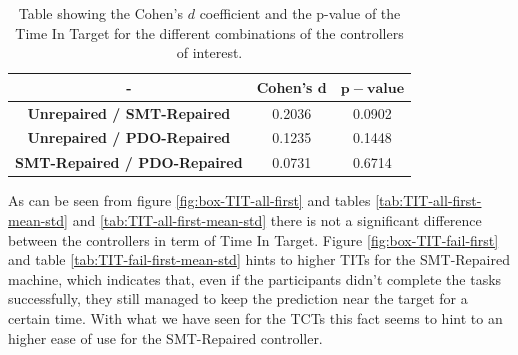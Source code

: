 \begin{table}[H]
    \centering
    \begin{tabular}{|c|c|c|}
        \hline
        - & \textbf{Cohen's} $\mathbf{d}$ & $\mathbf{p-value}$ \\
        \hline
        \textbf{Unrepaired / SMT-Repaired} & 0.2036 & 0.0902 \\
        \textbf{Unrepaired / PDO-Repaired} & 0.1235 & 0.1448\\
        \textbf{SMT-Repaired / PDO-Repaired} & 0.0731 & 0.6714 \\
        \hline
    \end{tabular}
    \caption{Table showing the Cohen's $d$ coefficient and the p-value of the Time In Target for the different combinations of the controllers of interest.}
    \label{tab:TIT-all-first-cohen-p}
\end{table}
As can be seen from figure \ref{fig:box-TIT-all-first} and tables \ref{tab:TIT-all-first-mean-std} and \ref{tab:TIT-all-first-mean-std} there is not a significant difference between the controllers in term of Time In Target. Figure \ref{fig:box-TIT-fail-first} and table \ref{tab:TIT-fail-first-mean-std} hints to higher TITs for the SMT-Repaired machine, which indicates that, even if the participants didn't complete the tasks successfully, they still managed to keep the prediction near the target for a certain time. With what we have seen for the TCTs this fact seems to hint to an higher ease of use for the SMT-Repaired controller.
